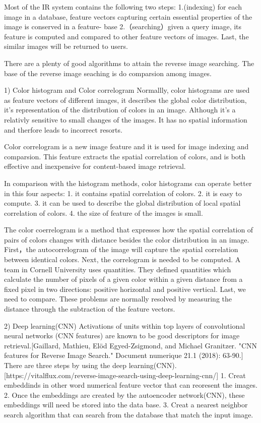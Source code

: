 Most of the IR system contains the following two steps:
1.(indexing)  for each image in a database, 
feature vectors capturing certain essential properties of the image is conserved in a feature- base
2.（searching）given a query image, its feature is computed and compared to other feature vectors of images.
Last, the similar images will be returned to users.

There are a plenty of good algorithms to attain the reverse image searching.
The base of the reverse image seaching is do comparsion among images.

1) Color histogram and Color correlogram %
Normallly, color histograms are used as feature vectors of different images,
it describes the global color distribution, it's representation of the distribution of colors in an image. %
Although it's a relativly sensitive to small changes of the images.
It has no spatial information and therfore leads to incorrect resorts.

Color correlogram is a new image feature and it is used for image indexing and comparsion.
This feature extracts the spatial correlation of colors, 
and is both effective and inexpensive for content-based image retrieval.

In comparison with the histogram methods, color histograms can operate better in this four aspects:
1. it contains spatial correlation of colors.
2. it is easy to compute.
3. it can be used to describe the global distribution of local spatial correlation of colors.
4. the size of feature of the images is small.

The color coerrelogram is a method that expresses how the spatial correlation of pairs of colors changes with distance besides the color distribution in an image.
First，the autocorrelogram of the image will capture the spatial correlation between identical colors.
Next, the correlogram is needed to be computed.
A team in Cornell University uses quantities. 
They defined quantities which calculate the number of pixels of a given color within a given distance from a fixed pixel in two directions: positive horizontal and positive vertical.
Last, we need to compare. These problems are normally resolved by measuring the distance through the subtraction of the feature vectors.




2) Deep learning(CNN)
Activations of units within top layers of convolutional neural networks (CNN features) are known to be good descriptors for image retrieval.[Gaillard, Mathieu, Elöd Egyed-Zsigmond, and Michael Granitzer. "CNN features for Reverse Image Search." Document numerique 21.1 (2018): 63-90.]
There are three steps by using the deep learning(CNN).[https://vitalflux.com/reverse-image-search-using-deep-learning-cnn/]
1. Creat embeddinds in other word numerical feature vector that can reoresent the images.
2. Once the embeddings are created by the autoencoder network(CNN), these embeddings will need be stored into the data base.
3. Creat a nearest neighbor search algorithm that can search from the database that match the input image.

